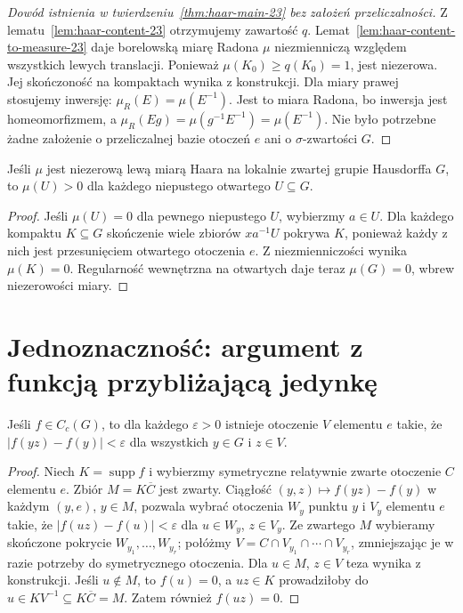 \begin{proof}[Dowód istnienia w twierdzeniu~\ref{thm:haar-main-23}
bez założeń przeliczalności]
Z lematu~\ref{lem:haar-content-23} otrzymujemy
zawartość $q$. Lemat~\ref{lem:haar-content-to-measure-23}
daje borelowską miarę Radona $\mu$ niezmienniczą
względem wszystkich lewych translacji.
Ponieważ $\mu(K_0)\ge q(K_0)=1$, jest niezerowa.
Jej skończoność na kompaktach wynika z konstrukcji.
Dla miary prawej stosujemy inwersję:
$\mu_R(E)=\mu(E^{-1})$.
Jest to miara Radona, bo inwersja jest homeomorfizmem,
a $\mu_R(Eg)=\mu(g^{-1}E^{-1})=\mu(E^{-1})$.
Nie było potrzebne żadne założenie o przeliczalnej bazie
otoczeń $e$ ani o $\sigma$-zwartości $G$.
\end{proof}

\begin{wniosek}
\label{cor:haar-open-positive-23}
Jeśli $\mu$ jest niezerową lewą miarą Haara
na lokalnie zwartej grupie Hausdorffa $G$, to
$\mu(U)>0$ dla każdego niepustego otwartego $U\subseteq G$.
\end{wniosek}
\begin{proof}
Jeśli $\mu(U)=0$ dla pewnego niepustego $U$, wybierzmy
$a\in U$. Dla każdego kompaktu $K\subseteq G$ skończenie
wiele zbiorów $xa^{-1}U$ pokrywa $K$, ponieważ każdy
z nich jest przesunięciem otwartego otoczenia $e$.
Z niezmienniczości wynika $\mu(K)=0$.
Regularność wewnętrzna na otwartych daje teraz
$\mu(G)=0$, wbrew niezerowości miary.
\end{proof}

\section{Jednoznaczność: argument z funkcją przybliżającą jedynkę}
\begin{lemat}
\label{lem:haar-uniform-23}
Jeśli $f\in C_c(G)$, to dla każdego $\varepsilon>0$
istnieje otoczenie $V$ elementu $e$ takie, że
$|f(yz)-f(y)|<\varepsilon$ dla wszystkich
$y\in G$ i $z\in V$.
\end{lemat}
\begin{proof}
Niech $K=\operatorname{supp}f$ i wybierzmy symetryczne
relatywnie zwarte otoczenie $C$ elementu $e$.
Zbiór $M=K\overline C$ jest zwarty. Ciągłość
$(y,z)\mapsto f(yz)-f(y)$ w każdym $(y,e)$,
$y\in M$, pozwala wybrać otoczenia $W_y$ punktu $y$
i $V_y$ elementu $e$ takie, że
$|f(uz)-f(u)|<\varepsilon$ dla $u\in W_y$, $z\in V_y$.
Ze zwartego $M$ wybieramy skończone pokrycie
$W_{y_1},\dots,W_{y_r}$; połóżmy
$V=C\cap V_{y_1}\cap\cdots\cap V_{y_r}$,
zmniejszając je w razie potrzeby do symetrycznego
otoczenia. Dla $u\in M$, $z\in V$ teza wynika
z konstrukcji. Jeśli $u\notin M$, to $f(u)=0$,
a $uz\in K$ prowadziłoby do
$u\in K V^{-1}\subseteq K\overline C=M$.
Zatem również $f(uz)=0$.
\end{proof}

